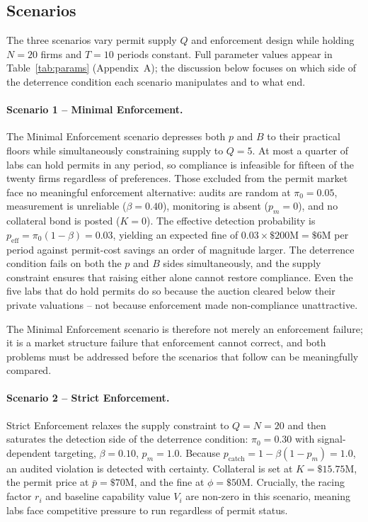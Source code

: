 \subsection{Scenarios}
\label{sec:scenarios}

The three scenarios vary permit supply $Q$ and enforcement design while holding $N = 20$ firms and $T = 10$ periods constant. Full parameter values appear in Table~\ref{tab:params} (Appendix~A); the discussion below focuses on which side of the deterrence condition each scenario manipulates and to what end.

\paragraph{Scenario 1 -- Minimal Enforcement.}

The Minimal Enforcement scenario depresses both $p$ and $B$ to their practical floors while simultaneously constraining supply to $Q = 5$. At most a quarter of labs can hold permits in any period, so compliance is infeasible for fifteen of the twenty firms regardless of preferences. Those excluded from the permit market face no meaningful enforcement alternative: audits are random at $\pi_0 = 0.05$, measurement is unreliable ($\beta = 0.40$), monitoring is absent ($p_m = 0$), and no collateral bond is posted ($K = 0$). The effective detection probability is $p_{\mathrm{eff}} = \pi_0(1-\beta) = 0.03$, yielding an expected fine of $0.03 \times \$200\text{M} = \$6\text{M}$ per period against permit-cost savings an order of magnitude larger. The deterrence condition fails on both the $p$ and $B$ sides simultaneously, and the supply constraint ensures that raising either alone cannot restore compliance. Even the five labs that do hold permits do so because the auction cleared below their private valuations -- not because enforcement made non-compliance unattractive.

The Minimal Enforcement scenario is therefore not merely an enforcement failure; it is a market structure failure that enforcement cannot correct, and both problems must be addressed before the scenarios that follow can be meaningfully compared.

\paragraph{Scenario 2 -- Strict Enforcement.}

Strict Enforcement relaxes the supply constraint to $Q = N = 20$ and then saturates the
detection side of the deterrence condition: $\pi_0 = 0.30$ with signal-dependent
targeting, $\beta = 0.10$, $p_m = 1.0$. Because $p_{\mathrm{catch}} = 1 -
\beta(1-p_m) = 1.0$, an audited violation is detected with certainty. Collateral
is set at $K = \$15.75$M, the permit price at $\bar{p} = \$70$M, and the fine
at $\phi = \$50$M. Crucially, the racing factor $r_i$ and baseline capability value $V_i$
are non-zero in this scenario, meaning labs face competitive pressure to run regardless
of permit status.


